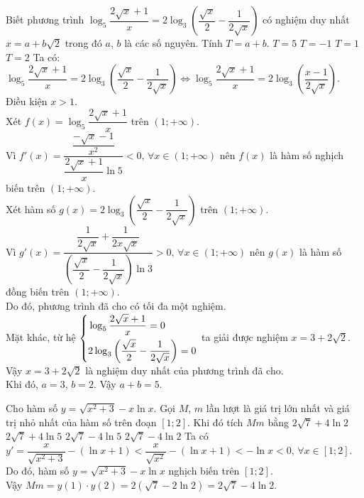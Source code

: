 \begin{ex}%
 Biết phương trình $\log_5\dfrac{2\sqrt{x}+1}{x}=2\log_3\left(\dfrac{\sqrt{x}}{2}-\dfrac{1}{2\sqrt{x}}\right)$ có nghiệm duy nhất $x=a+b\sqrt{2}$ trong đó $a$, $b$ là các số nguyên. Tính $T=a+b$.
 \choice
  {\True $T=5$}
  {$T=-1$}
  {$T=1$}
  {$T=2$}
 \loigiai
  {
  Ta có: $\log_5 \dfrac{2\sqrt x+1}{x}=2\log_3\left(\dfrac{\sqrt x}{2}-\dfrac{1}{2\sqrt x}\right)\Leftrightarrow \log_5 \dfrac{2\sqrt x+1}{x}=2\log_3\left(\dfrac{x-1}{2\sqrt x}\right)$.\\
  Điều kiện $x>1$.\\
  Xét $f(x)=\log_5 \dfrac{2\sqrt x+1}{x} $ trên $(1;+\infty)$.\\
  Vì $f'(x)=\dfrac{\dfrac{-\sqrt x-1}{x^2}}{\dfrac{2\sqrt x+1}{x}\ln 5}<0,\,\forall x\in (1;+\infty)$ 
  nên $f(x)$ là hàm số nghịch biến trên $(1;+\infty)$.\\
  Xét hàm số $g(x)=2\log_3\left(\dfrac{\sqrt x}{2}-\dfrac{1}{2\sqrt x}\right)$ trên $(1;+\infty)$.\\
  Vì $g'(x)=\dfrac{\dfrac{1}{2\sqrt x}+\dfrac{1}{2x\sqrt x}}{\left(\dfrac{\sqrt x}{2}-\dfrac{1}{2\sqrt x}\right)\ln 3}>0,\,\forall x\in (1;+\infty)$ 
  nên $g(x)$ là hàm số đồng biến trên $(1;+\infty)$.\\
  Do đó, phương trình đã cho có tối đa một nghiệm.\\
  Mặt khác, từ hệ $\left\{\begin{aligned}&\log_5 \dfrac{2\sqrt x+1}{x}=0\\&2\log_3\left(\dfrac{\sqrt x}{2}-\dfrac{1}{2\sqrt x}\right)=0\end{aligned}\right.$ ta giải được nghiệm $x=3+2\sqrt 2$.\\
  Vậy $x=3+2\sqrt 2$ là nghiệm duy nhất của phương trình đã cho. \\
  Khi đó, $a=3$, $b=2$. Vậy $a+b=5$.
  }
\end{ex}

\begin{ex}%
 Cho hàm số $y=\sqrt{x^2+3}-x\ln x$. Gọi $M$, $m$ lần lượt là giá trị lớn nhất và giá trị nhỏ nhất của hàm số trên đoạn $[1;2]$. Khi đó tích $Mm$ bằng
 \choice
  {$2\sqrt{7}+4\ln2$}
  {$2\sqrt{7}+4\ln5$}
  {$2\sqrt{7}-4\ln5$}
  {\True $2\sqrt{7}-4\ln2$}
 \loigiai
  {
  Ta có $y'=\dfrac{x}{\sqrt{x^2+3}}-(\ln x+1)<\dfrac{x}{\sqrt{x^2}}-(\ln x+1)<-\ln x<0,\,\forall x\in [1;2].$\\
  Do đó, hàm số $y=\sqrt{x^2+3}-x\ln x$ nghịch biến trên $[1;2]$.\\
  Vậy $Mm=y(1)\cdot y(2)=2\left(\sqrt7-2\ln2\right)=2\sqrt{7}-4\ln2$.
  }
\end{ex}

